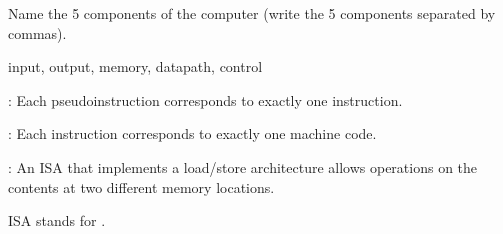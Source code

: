 

\renewcommand\AUTHOR{aoro1@cougars.ccis.edu}

\topmattertwo

\nextq
Name the 5 components of the computer
(write the 5 components separated by commas).
\\
\ANSWER
\begin{answerlong}
input, output, memory, datapath, control
\end{answerlong}

\nextq
\tf:
Each pseudoinstruction corresponds to exactly one instruction.

\dotfill{}

\nextq
\tf:
Each instruction corresponds to exactly one machine code.
\dotfill{}

\nextq
\tf:
An ISA that implements a load/store architecture allows operations on the
contents at two different memory locations.
\dotfill{}

\nextq
ISA stands for
.

\newpage


